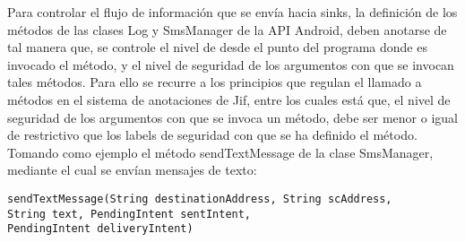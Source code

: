 Para controlar el flujo de información que se envía hacia sinks, la
definición de los métodos de las clases Log y SmsManager de la API Android,
deben anotarse de tal manera que, se controle el nivel de desde el
punto del programa donde es invocado el método, y el nivel de seguridad de los
argumentos con que se invocan tales métodos.\newline 
Para ello se recurre a los principios que regulan el llamado a métodos
en el sistema de anotaciones de Jif, entre los cuales está que, el nivel de
seguridad de los argumentos con que se invoca un método, debe ser menor o igual
de restrictivo que los labels de seguridad con que se ha definido
el método.
Tomando como ejemplo el método sendTextMessage de
la clase SmsManager, mediante el cual se envían mensajes de texto:
\begin{lstlisting}[basicstyle=\scriptsize]
sendTextMessage(String destinationAddress, String scAddress, 
String text, PendingIntent sentIntent, 
PendingIntent deliveryIntent)
\end{lstlisting}

